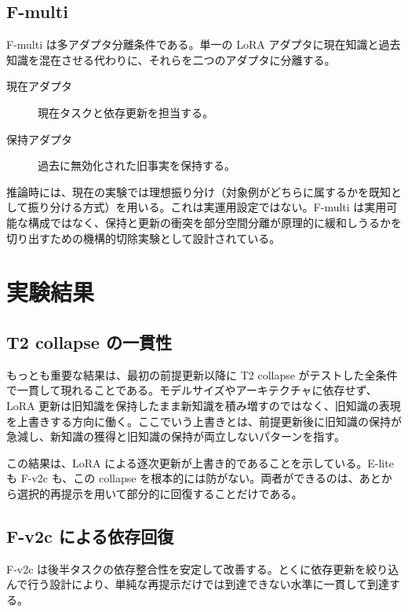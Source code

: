 \documentclass[12pt,a4paper]{article}
\begin{document}
\subsection{F-multi}

F-multi は多アダプタ分離条件である。単一の LoRA アダプタに現在知識と過去知識を混在させる代わりに、それらを二つのアダプタに分離する。

\begin{description}
  \item[現在アダプタ] 現在タスクと依存更新を担当する。
  \item[保持アダプタ] 過去に無効化された旧事実を保持する。
\end{description}

推論時には、現在の実験では理想振り分け（対象例がどちらに属するかを既知として振り分ける方式）を用いる。これは実運用設定ではない。F-multi は実用可能な構成ではなく、保持と更新の衝突を部分空間分離が原理的に緩和しうるかを切り出すための機構的切除実験として設計されている。

\section{実験結果}

\subsection{T2 collapse の一貫性}

もっとも重要な結果は、最初の前提更新以降に T2 collapse がテストした全条件で一貫して現れることである。モデルサイズやアーキテクチャに依存せず、LoRA 更新は旧知識を保持したまま新知識を積み増すのではなく、旧知識の表現を上書きする方向に働く。ここでいう上書きとは、前提更新後に旧知識の保持が急減し、新知識の獲得と旧知識の保持が両立しないパターンを指す。

この結果は、LoRA による逐次更新が上書き的であることを示している。E-lite も F-v2c も、この collapse を根本的には防がない。両者ができるのは、あとから選択的再提示を用いて部分的に回復することだけである。

\subsection{F-v2c による依存回復}

F-v2c は後半タスクの依存整合性を安定して改善する。とくに依存更新を絞り込んで行う設計により、単純な再提示だけでは到達できない水準に一貫して到達する。
\end{document}
